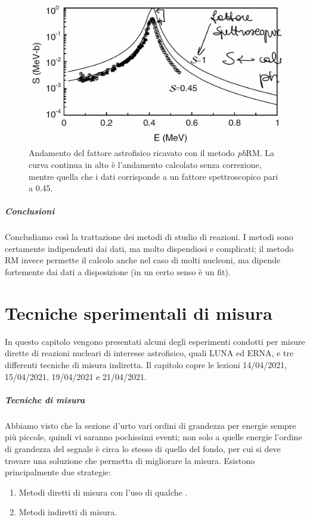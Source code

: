 \begin{figure}[h]
	\centering
	\includegraphics[scale=0.3]{Immagini/0414_RM2.png}
	\caption{Andamento del fattore astrofisico ricavato con il metodo \textit{ph}RM. La curva continua in alto è l'andamento calcolato senza correzione, mentre quella che  i dati corrisponde a un fattore spettroscopico pari a 0.45.}
	\label{0414_phRM2}
\end{figure}
\newpage
\paragraph{Conclusioni} Concludiamo così la trattazione dei metodi di studio di reazioni. I metodi  sono certamente indipendenti dai dati, ma molto dispendiosi e complicati; il metodo RM invece permette il calcolo anche nel caso di molti nucleoni, ma dipende fortemente dai dati a disposizione (in un certo senso è un fit). 


\chapter{Tecniche sperimentali di misura}
In questo capitolo vengono presentati alcuni degli esperimenti condotti per misure dirette di reazioni nucleari di interesse astrofisico, quali LUNA ed ERNA, e tre differenti tecniche di misura indiretta. Il capitolo copre le lezioni 14/04/2021, 15/04/2021, 19/04/2021 e 21/04/2021.

\paragraph{Tecniche di misura} 
Abbiamo visto che la sezione d'urto  vari ordini di grandezza per energie sempre più piccole, quindi vi saranno pochissimi eventi; non solo a quelle energie l'ordine di grandezza del segnale è circa lo stesso di quello del fondo, per cui si deve trovare una soluzione che permetta di migliorare la misura. Esistono principalmente due strategie:
\begin{enumerate}
	\item Metodi diretti di misura con l'uso di qualche .
	\item Metodi indiretti di misura.
\end{enumerate}

